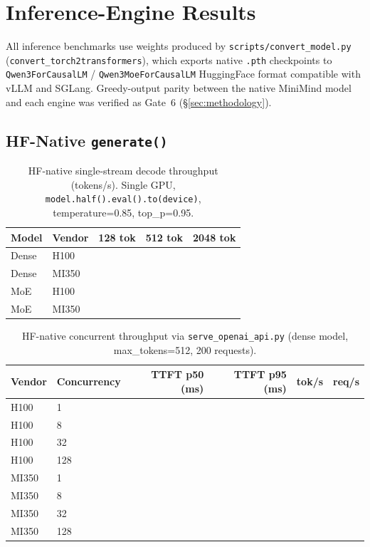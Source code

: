 \section{Inference-Engine Results}
\label{sec:inference}

All inference benchmarks use weights produced by
\texttt{scripts/convert\_model.py} (\texttt{convert\_torch2transformers}),
which exports native \texttt{.pth} checkpoints to \texttt{Qwen3ForCausalLM} /
\texttt{Qwen3MoeForCausalLM} HuggingFace format compatible with vLLM and SGLang.
Greedy-output parity between the native MiniMind model and each engine was
verified as Gate~6 (\S\ref{sec:methodology}).

\subsection{HF-Native \texttt{generate()}}
\label{sec:inference:hf}

\begin{table}[h]
\centering
\caption{HF-native single-stream decode throughput (tokens/s). Single GPU,
\texttt{model.half().eval().to(device)}, temperature=0.85, top\_p=0.95.}
\label{tab:hf_single}
\small
\begin{tabular}{llrrr}
\toprule
\textbf{Model} & \textbf{Vendor} & \textbf{128 tok} & \textbf{512 tok} & \textbf{2048 tok} \\
\midrule
Dense & H100  & \PH{} & \PH{} & \PH{} \\
Dense & MI350 & \PH{} & \PH{} & \PH{} \\
MoE   & H100  & \PH{} & \PH{} & \PH{} \\
MoE   & MI350 & \PH{} & \PH{} & \PH{} \\
\bottomrule
\end{tabular}
\end{table}

\begin{table}[h]
\centering
\caption{HF-native concurrent throughput via \texttt{serve\_openai\_api.py}
(dense model, max\_tokens=512, 200 requests).}
\label{tab:hf_concurrent}
\small
\begin{tabular}{llrrrr}
\toprule
\textbf{Vendor} & \textbf{Concurrency} &
\textbf{TTFT p50 (ms)} & \textbf{TTFT p95 (ms)} &
\textbf{tok/s} & \textbf{req/s} \\
\midrule
H100  & 1   & \PH{} & \PH{} & \PH{} & \PH{} \\
H100  & 8   & \PH{} & \PH{} & \PH{} & \PH{} \\
H100  & 32  & \PH{} & \PH{} & \PH{} & \PH{} \\
H100  & 128 & \PH{} & \PH{} & \PH{} & \PH{} \\
\midrule
MI350 & 1   & \PH{} & \PH{} & \PH{} & \PH{} \\
MI350 & 8   & \PH{} & \PH{} & \PH{} & \PH{} \\
MI350 & 32  & \PH{} & \PH{} & \PH{} & \PH{} \\
MI350 & 128 & \PH{} & \PH{} & \PH{} & \PH{} \\
\bottomrule
\end{tabular}
\end{table}

